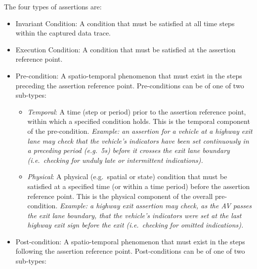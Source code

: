 The four types of assertions are:
\begin{itemize}
    \item Invariant Condition:
A condition that must be satisfied at all time steps within the captured data trace.
     \item Execution Condition:
A condition that must be satisfied at the assertion reference point.
    \item Pre-condition: %
    A spatio-temporal phenomenon that must exist in the steps preceding the assertion reference point. Pre-conditions can be of one of two sub-types:
    \begin{itemize}
        \item \textit{Temporal}: A time (step or period) prior to the assertion reference point, within which a specified condition holds. This is the temporal component of the pre-condition. %
        \textit{Example: an assertion for a vehicle at a highway exit lane may check that the vehicle's indicators have been set continuously in a preceding period (e.g.\ 5s) before it crosses the exit lane boundary (i.e.\ checking for unduly late or intermittent indications).}
        \item \textit{Physical}: A physical (e.g.\ spatial or state) condition that must be satisfied at a specified time (or within a  time period) before the assertion reference point. This is the physical component of the overall pre-condition. %
        \textit{Example: a highway exit assertion may check, as the AV passes the exit lane boundary, that the vehicle's indicators were set at the last highway exit sign before the exit (i.e.\ checking for omitted indications).}
    \end{itemize}
    \item Post-condition: %
    A spatio-temporal phenomenon that must exist in the steps following the assertion reference point. Post-conditions can be of one of two sub-types:

\end{itemize}
